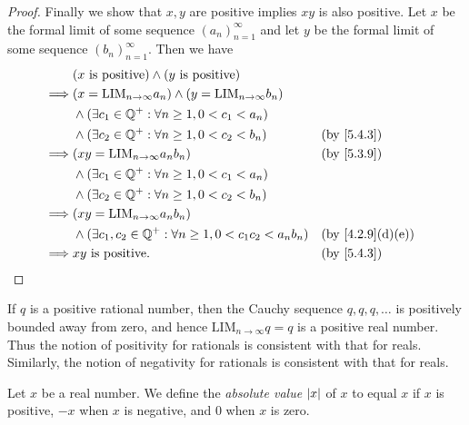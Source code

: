 \begin{proof}
  Finally we show that \(x, y\) are positive implies \(xy\) is also positive.
  Let \(x\) be the formal limit of some sequence \((a_n)_{n = 1}^{\infty}\) and let \(y\) be the formal limit of some sequence \((b_n)_{n = 1}^{\infty}\).
  Then we have
  \begin{align*}
             & (x \text{ is positive}) \land (y \text{ is positive})                                              \\
    \implies & (x = \text{LIM}_{n \to \infty} a_n) \land (y = \text{LIM}_{n \to \infty} b_n)                      \\
             & \land (\exists c_1 \in \Q^+ : \forall n \geq 1, 0 < c_1 < a_n)                                     \\
             & \land (\exists c_2 \in \Q^+ : \forall n \geq 1, 0 < c_2 < b_n)                &  & \by{5.4.3}      \\
    \implies & (xy = \text{LIM}_{n \to \infty} a_n b_n)                                      &  & \by{5.3.9}      \\
             & \land (\exists c_1 \in \Q^+ : \forall n \geq 1, 0 < c_1 < a_n)                                     \\
             & \land (\exists c_2 \in \Q^+ : \forall n \geq 1, 0 < c_2 < b_n)                                     \\
    \implies & (xy = \text{LIM}_{n \to \infty} a_n b_n)                                                           \\
             & \land (\exists c_1, c_2 \in \Q^+ : \forall n \geq 1, 0 < c_1 c_2 < a_n b_n)   &  & \by{4.2.9}[d,e] \\
    \implies & xy \text{ is positive}.                                                       &  & \by{5.4.3}
  \end{align*}
\end{proof}

\begin{note}
  If \(q\) is a positive rational number, then the Cauchy sequence \(q, q, q, \dots\) is positively bounded away from zero, and hence \(\text{LIM}_{n \to \infty} q = q\) is a positive real number.
  Thus the notion of positivity for rationals is consistent with that for reals.
  Similarly, the notion of negativity for rationals is consistent with that for reals.
\end{note}

\begin{defn}\label{5.4.5}
  Let \(x\) be a real number.
  We define the \emph{absolute value} \(\left\lvert x\right\rvert\) of \(x\) to equal \(x\) if \(x\) is positive, \(-x\) when \(x\) is negative, and \(0\) when \(x\) is zero.
\end{defn}


